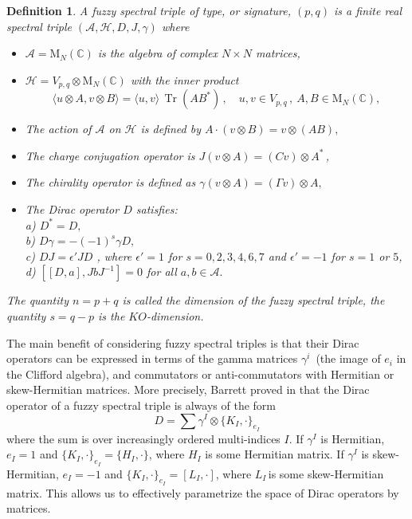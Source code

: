 \documentclass[10pt]{article}
\newtheorem{definition}{Definition}[section]
\DeclareMathOperator{\tr}{Tr}
\begin{document}
\begin{definition}\label{fuzzy def}
  A  {\emph fuzzy spectral triple of type, or signature, ${(p,q)}$} is a finite real spectral triple
  ${\left( { \mathcal{A}, \mathcal{H} , D , J, \gamma } \right)}$ where
  \begin{itemize}
 		\item
 		${ \mathcal{A}= {{\mathrm{M}}_N (\mathbb{C})} }$  is the algebra of complex $N \times N$ matrices,
 		\item
 		${ \mathcal{H} = V_{p,q} \otimes {{\mathrm{M}}_N (\mathbb{C})} }$ with the inner product
 		$${ \langle {u \otimes A , v \otimes B} \rangle = \langle u , v \rangle \, \tr \left( A B^\ast \right)
 			\, , \quad u,v \in V_{p,q} \, , \  A,B \in {{\mathrm{M}}_N (\mathbb{C})} },$$
 		\item The action of $\mathcal{A}$ on $\mathcal{H}$ is defined by 
 		${ A \cdot (v \otimes B) = v \otimes \left( AB \right),   }$
 			\item The charge conjugation operator is 
 		${ J (v \otimes A) = (C v) \otimes A^\ast  \,}$,
 		\item The chirality operator is defined as 
 		${ \gamma (v \otimes A) = (\Gamma v) \otimes A },$
 	
 		\item The Dirac operator $D$ satisfies:\\
 		a) $D^* =D,$\\
 		b) $D\gamma = - (-1)^s \gamma D,$\\
 		c) $DJ= \epsilon' JD$ , where $\epsilon'  = 1$ for $s = 0, 2, 3, 4, 6, 7$  and $\epsilon' = -1$ for $s = 1$ or $ 5$,\\
 		d) $[[D, a], JbJ^{-1}]=  0$ for all $a, b \in \mathcal{A}.$ 
 	\end{itemize}
  The quantity $n = p+q$ is called the dimension of the fuzzy spectral triple, the quantity $s = q- p$ is the $KO$-dimension.
\end{definition}
 
The main benefit of considering fuzzy spectral triples is that their Dirac operators can be expressed in terms of the gamma matrices ${\gamma^i \,}$ (the image of $e_{i}$ in the Clifford algebra), and commutators or anti-commutators with  Hermitian or skew-Hermitian matrices. More precisely, Barrett proved in \cite{Barrett2015} that the Dirac operator of a fuzzy spectral triple is always of the form
\begin{equation}
	D=\sum \gamma^{I}\otimes \{K_{I},\cdot\}_{e_{I}}
  \label{general fuzzy Dirac}
\end{equation}
where the sum is over increasingly ordered multi-indices $I$.
If $\gamma^I$ is Hermitian, $e_I = 1$ and $\{K_{I},\cdot\}_{e_{I}} = \{H_{I},\cdot \}$, where $H_{I}$ is some Hermitian matrix.
If $\gamma^I$ is skew-Hermitian, $e_I = -1$ and $\{K_{I},\cdot\}_{e_{I}} = [L_{I},\cdot ]$, where $L_{I}\,$is some skew-Hermitian matrix. 
This allows us to effectively parametrize the space of Dirac operators by matrices.
\end{document}
